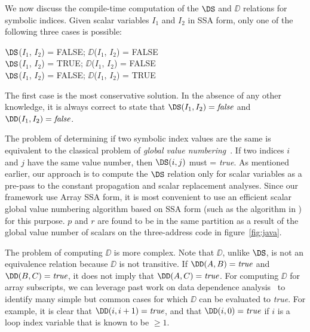 {We now discuss the compile-time
computation of the $\DS$ and $\DD$ relations for symbolic
indices. 
Given scalar variables $I_1$ and $I_2$
in SSA form, only one of the following three cases
is possible:
\begin{center}
\parbox{2.5in}{
\begin{programa}
$\DS$($I_1$, $I_2$) = FALSE; $\DD$($I_1$, $I_2$) = FALSE \\
$\DS$($I_1$, $I_2$) = TRUE; $\DD$($I_1$, $I_2$) = FALSE \\
$\DS$($I_1$, $I_2$) = FALSE; $\DD$($I_1$, $I_2$) = TRUE \\
\end{programa}
}
\end{center}
The first case is the most conservative solution.  In the absence of
any other knowledge, it is always correct to state that
$\DS(I_1,I_2) = \mbox{\it false}$ and $\DD(I_1,I_2) = \mbox{\it
false}$.

The problem of determining if two symbolic index values are the same
is equivalent to the classical problem of {\it global value
numbering}~\cite{AlpernWZ88,Much97}. If two indices $i$ and $j$ have the
same value number, then $\DS(i,j)$ must = {\it true}.  As mentioned
earlier, our approach is to compute the $\DS$ relation only for scalar
variables as a pre-pass to the constant propagation and scalar
replacement analyses.  Since our framework use Array SSA form, it is
most convenient to use an efficient scalar global value numbering
algorithm based on SSA form (such as the algorithm in
\cite{AlpernWZ88}) for this purpose. $p$ and $r$ are found to be in the
same partition as a result of the global value number of scalars on
the three-address code in figure~\ref{fig:java}.


The problem of
computing $\DD$ is more complex.  Note that $\DD$, unlike $\DS$, is not
an equivalence relation because $\DD$ is not transitive.  If $\DD(A,
B)=\mbox{\it true}$ and $\DD(B, C)=\mbox{\it true}$, it does not imply
that $\DD(A, C)=\mbox{\it true}$.  For computing $\DD$ for array
subscripts, we can leverage past work on data dependence
analysis~\cite{Wolf89} to identify many simple but common cases for
which $\DD$ can be evaluated to {\it true}.  For example, it is clear
that $\DD(i, i+1) = \mbox{\it true}$, and that $\DD(i, 0) = \mbox{\it
true}$ if $i$ is a loop index variable that is known to be $\geq 1$.

}
